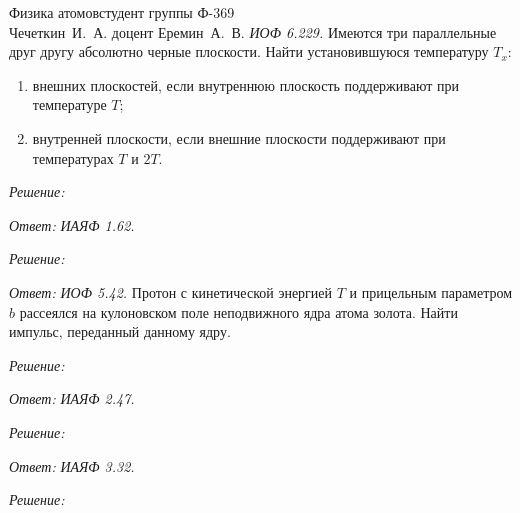 




\renewcommand{\labelenumi}{\asbuk{enumi})}


{Физика атомов}{студент группы Ф-369\\Чечеткин~И.~А.}
{доцент Еремин~А.~В.}{\!\!}
\newpage
\emph{ИОФ 6.229.}
Имеются три параллельные друг другу абсолютно черные плоскости.
Найти установившуюся температуру \( T_x \):
\begin{enumerate}
    \item внешних плоскостей, если внутреннюю плоскость поддерживают при
    температуре \( T \);
    \item внутренней плоскости, если внешние плоскости поддерживают при
    температурах \( T \) и \( 2T \).
\end{enumerate}

\vspace*{2em}
\emph{Решение:}

\vspace*{2em}        
\emph{Ответ:}
\newpage
\emph{ИАЯФ 1.62.}

\vspace*{2em}
\emph{Решение:}

\vspace*{2em}
\emph{Ответ:}
\newpage
\emph{ИОФ 5.42.}
Протон с кинетической энергией \( T \) и прицельным параметром \( b \) рассеялся
на кулоновском поле неподвижного ядра атома золота. Найти импульс, переданный
данному ядру.

\vspace*{2em}
\emph{Решение:}

\vspace*{2em}
\emph{Ответ:}
\newpage
\emph{ИАЯФ 2.47.}

\vspace*{2em}
\emph{Решение:}

\vspace*{2em}
\emph{Ответ:}
\newpage
\emph{ИАЯФ 3.32.}

\vspace*{2em}
\emph{Решение:}

